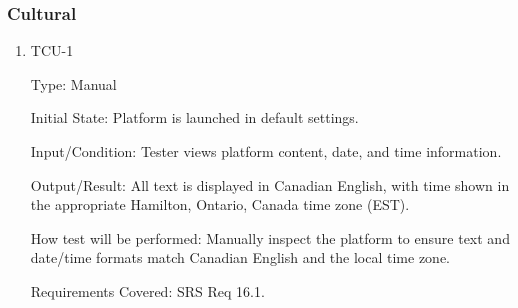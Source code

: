 \documentclass[12pt, titlepage]{article}
\begin{document}
\subsubsection{Cultural}

\begin{enumerate}

\item{TCU-1\\}

Type: Manual
					
Initial State: Platform is launched in default settings.
					
Input/Condition: Tester views platform content, date, and time information.
					
Output/Result: All text is displayed in Canadian English, with time shown in the appropriate Hamilton, Ontario, Canada time zone (EST).
					
How test will be performed: Manually inspect the platform to ensure text and date/time formats match Canadian English and the local time zone.

Requirements Covered: SRS Req 16.1.

\end{enumerate}
\end{document}
